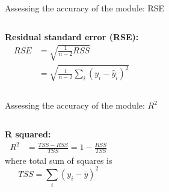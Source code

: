 \documentclass[aspectratio=169,usenames,dvipsnames]{beamer}
\newcommand{\InstructorNotes}[1]{\textit{\color{orange}#1}}
\newcommand{\InstructorList}[1]{
\begin{itemize}
	\color{orange}
	#1
\end{itemize}
}
\renewcommand{\InstructorNotes}[1]{}
\renewcommand{\InstructorList}[1]{}
\begin{document}
\begin{frame}[c]{Assessing the accuracy of the module: RSE}
	\centering
\InstructorNotes{Quantify the extent to which the model fits the data}
\begin{columns}
\textbf{Residual standard error (RSE):}
\begin{align*}
	RSE &= \sqrt{ \frac{1}{n-2} RSS}\\
	& = \sqrt{ \frac{1}{n-2} \sum_i (y_i - \hat y_i)^2}
\end{align*}

\InstructorList{
\item estimate of the standard deviation of $\e$
\item Avg amount that the response will deviate from the true regression line 
\item  avg amount response will deviate from the true regression line}
\end{columns}

\end{frame}
\begin{frame}[c]{Assessing the accuracy of the module: $R^2$}
	\centering
\begin{columns}
\textbf{R squared:}
\begin{align*}
	R^2 &= \frac{TSS-RSS}{TSS} = 1-\frac{RSS}{TSS}
\end{align*}
where total sum of squares is
\begin{equation*}
	TSS = \sum_i (y_i - \overline y)^2
\end{equation*}
\InstructorList{
\item TSS is total variance in the response $Y$, variability before regression
\item RSS amount of variability after the regression
\item $R^2$ is proportion of variability in $Y$ that can be explained using $X$
\item Close to 1, large proportion of variability is explained by regression
\item Close to 0, regression does not explain much of the variability in the response
}
\end{columns}

\end{frame}
\end{document}
